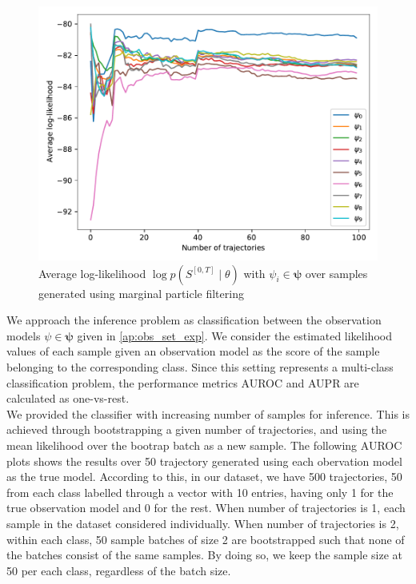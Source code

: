\begin{figure}[H]
	\begin{center}
		\includegraphics[width=.7\textwidth]{figures/roc_analysis/roc_particleFilter/llh_particleFilter_psi_0}
		\caption[Average log-likelihood in the case of marginal particle filtering]{Average log-likelihood $ \log p(S^{[0,T]} \mid \theta) $ with $ \psi_i \in \symbf{\psi} $ over samples generated using marginal particle filtering}
		\label{fig:llh_particle}
	\end{center}
\end{figure}
\pagebreak
We approach the inference problem as classification between the observation models $ \psi \in \symbf{\psi} $ given in \cref{ap:obs_set_exp}. We consider the estimated likelihood values of each sample given an observation model as the score of the sample belonging to the corresponding class. Since this setting represents a multi-class classification problem, the
performance metrics AUROC and AUPR are calculated as one-vs-rest. \\ %
We provided the classifier with increasing number of samples for inference. This is achieved through bootstrapping a given number of trajectories, and using the mean likelihood over the bootrap batch as a new sample. The following AUROC plots shows the results over 50 trajectory generated using each obervation model as the true model. According to this, in our dataset, we have 500 trajectories, 50 from each class labelled through a vector with 10 entries, having only 1 for the true observation model and 0 for the rest. When number of trajectories is 1, each sample in the dataset considered individually. When number of trajectories is 2, within each class, 50 sample batches of size 2 are bootstrapped such that none of the batches consist of the same samples. By doing so, we keep the sample size at 50 per each class, regardless of the batch size. \\

